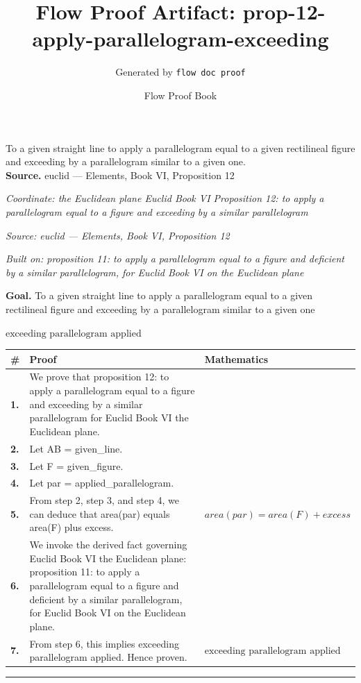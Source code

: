 \documentclass[11pt]{article}
\title{Flow Proof Artifact: prop-12-apply-parallelogram-exceeding}
\author{Generated by \texttt{flow doc proof}}
\date{Flow Proof Book}
\theoremstyle{definition}
\begin{document}
\maketitle
To a given straight line to apply a parallelogram equal to a given rectilineal figure and exceeding by a parallelogram similar to a given one.\\[0.5em]
\textbf{Source.} euclid — Elements, Book VI, Proposition 12\\[0.5em]
\bigskip
{}\par
\smallskip\noindent\textit{Coordinate: the Euclidean plane \cdot Euclid Book VI \cdot Proposition 12: to apply a parallelogram equal to a figure and exceeding by a similar parallelogram}\par
\smallskip\noindent\textit{Source: euclid — Elements, Book VI, Proposition 12}\par
\smallskip\noindent\textit{Built on: proposition 11: to apply a parallelogram equal to a figure and deficient by a similar parallelogram, for Euclid Book VI on the Euclidean plane}\par
\medskip
\noindent\textbf{Goal.} To a given straight line to apply a parallelogram equal to a given rectilineal figure and exceeding by a parallelogram similar to a given one\par
\noindent$\displaystyle \text{exceeding parallelogram applied}$\par
\medskip
\noindent
\begin{tabular}{@{} >{\raggedright\arraybackslash}p{} >{\raggedright\arraybackslash}p{} >{\raggedleft\arraybackslash}p{} @{}}
\textbf{\#} & \textbf{Proof} & \textbf{Mathematics} \\
\midrule
\textbf{1.} & We prove that proposition 12: to apply a parallelogram equal to a figure and exceeding by a similar parallelogram for Euclid Book VI the Euclidean plane. & \\[0.45em]
\textbf{2.} & Let AB = given\_line. & \\[0.45em]
\textbf{3.} & Let F = given\_figure. & \\[0.45em]
\textbf{4.} & Let par = applied\_parallelogram. & \\[0.45em]
\textbf{5.} & From step 2, step 3, and step 4, we can deduce that area(par) equals area(F) plus excess. & $\displaystyle area(par) = area(F) + excess$ \\[0.45em]
\textbf{6.} & We invoke the derived fact governing Euclid Book VI the Euclidean plane: proposition 11: to apply a parallelogram equal to a figure and deficient by a similar parallelogram, for Euclid Book VI on the Euclidean plane. & \\[0.45em]
\textbf{7.} & From step 6, this implies exceeding parallelogram applied. Hence proven. & $\displaystyle \text{exceeding parallelogram applied}$ \\[0.45em]
\bottomrule
\end{tabular}
\label{thm:Geometry-Euclid Book VI-proposition_12_to_apply_a_parallelogram_equal_to_a_figure_and_exceeding_by_a_similar_parallelogram}
\par\medskip\hrule
\end{document}
